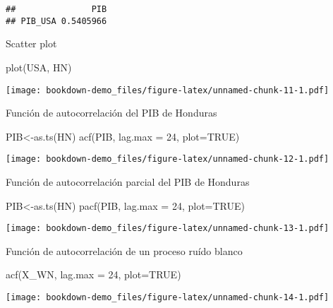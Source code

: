 \documentclass[
]{book}
\newenvironment{Shaded}{\begin{snugshade}}{\end{snugshade}}
\newcommand{\AttributeTok}[1]{\textcolor[rgb]{0.77,0.63,0.00}{#1}}
\newcommand{\ConstantTok}[1]{\textcolor[rgb]{0.00,0.00,0.00}{#1}}
\newcommand{\DecValTok}[1]{\textcolor[rgb]{0.00,0.00,0.81}{#1}}
\newcommand{\FunctionTok}[1]{\textcolor[rgb]{0.00,0.00,0.00}{#1}}
\newcommand{\NormalTok}[1]{#1}
\newcommand{\OtherTok}[1]{\textcolor[rgb]{0.56,0.35,0.01}{#1}}
\begin{document}
\begin{verbatim}
##               PIB
## PIB_USA 0.5405966
\end{verbatim}

Scatter plot

\begin{Shaded}
\begin{Highlighting}[]
\FunctionTok{plot}\NormalTok{(USA, HN)}
\end{Highlighting}
\end{Shaded}

\texttt{[image: bookdown-demo\_files/figure-latex/unnamed-chunk-11-1.pdf]}

Función de autocorrelación del PIB de Honduras

\begin{Shaded}
\begin{Highlighting}[]
\NormalTok{PIB}\OtherTok{\textless{}{-}}\FunctionTok{as.ts}\NormalTok{(HN)}
\FunctionTok{acf}\NormalTok{(PIB, }\AttributeTok{lag.max =} \DecValTok{24}\NormalTok{, }\AttributeTok{plot=}\ConstantTok{TRUE}\NormalTok{)}
\end{Highlighting}
\end{Shaded}

\texttt{[image: bookdown-demo\_files/figure-latex/unnamed-chunk-12-1.pdf]}

Función de autocorrelación parcial del PIB de Honduras

\begin{Shaded}
\begin{Highlighting}[]
\NormalTok{PIB}\OtherTok{\textless{}{-}}\FunctionTok{as.ts}\NormalTok{(HN)}
\FunctionTok{pacf}\NormalTok{(PIB, }\AttributeTok{lag.max =} \DecValTok{24}\NormalTok{, }\AttributeTok{plot=}\ConstantTok{TRUE}\NormalTok{)}
\end{Highlighting}
\end{Shaded}

\texttt{[image: bookdown-demo\_files/figure-latex/unnamed-chunk-13-1.pdf]}

Función de autocorrelación de un proceso ruído blanco

\begin{Shaded}
\begin{Highlighting}[]
\FunctionTok{acf}\NormalTok{(X\_WN, }\AttributeTok{lag.max =} \DecValTok{24}\NormalTok{, }\AttributeTok{plot=}\ConstantTok{TRUE}\NormalTok{)}
\end{Highlighting}
\end{Shaded}

\texttt{[image: bookdown-demo\_files/figure-latex/unnamed-chunk-14-1.pdf]}
\end{document}
